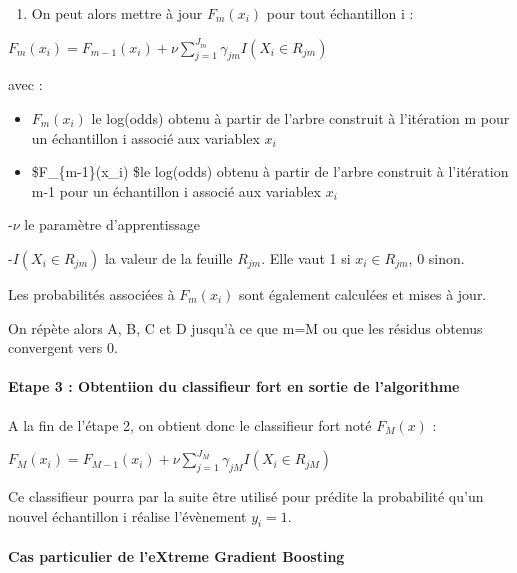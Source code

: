 \documentclass[
]{article}
\providecommand{\tightlist}{%
  \setlength{\itemsep}{0pt}\setlength{\parskip}{0pt}}
\begin{document}
\begin{enumerate}
\def\labelenumi{\Alph{enumi})}
\setcounter{enumi}{3}
\tightlist
\item
  On peut alors mettre à jour \(F_m(x_i)\) pour tout échantillon i :
\end{enumerate}

\begin{center}
   $F_m(x_i)=F_{m-1}(x_i)+ \nu \sum_{j=1}^{J_m}\gamma_{jm}I(X_i \in R_{jm})$
\end{center}

avec :

\begin{itemize}
\item
  \(F_m(x_i)\) le log(odds) obtenu à partir de l'arbre construit à
  l'itération m pour un échantillon i associé aux variablex \(x_i\)
\item
  \$F\_\{m-1\}(x\_i) \$le log(odds) obtenu à partir de l'arbre construit
  à l'itération m-1 pour un échantillon i associé aux variablex \(x_i\)
\end{itemize}

-\(\nu\) le paramètre d'apprentissage

-\(I(X_i \in R_{jm})\) la valeur de la feuille \(R_{jm}\). Elle vaut 1
si \(x_i \in R_{jm}\), 0 sinon.

Les probabilités associées à \(F_m(x_i)\) sont également calculées et
mises à jour.

On répète alors A, B, C et D jusqu'à ce que m=M ou que les résidus
obtenus convergent vers 0.

\hypertarget{etape-3-obtentiion-du-classifieur-fort-en-sortie-de-lalgorithme}{%
\paragraph{Etape 3 : Obtentiion du classifieur fort en sortie de
l'algorithme}\label{etape-3-obtentiion-du-classifieur-fort-en-sortie-de-lalgorithme}}

A la fin de l'étape 2, on obtient donc le classifieur fort noté
\(F_M(x)\) :

\begin{center}
   $F_M(x_i)=F_{M-1}(x_i)+ \nu \sum_{j=1}^{J_M}\gamma_{jM}I(X_i \in R_{jM})$
\end{center}

Ce classifieur pourra par la suite être utilisé pour prédite la
probabilité qu'un nouvel échantillon i réalise l'évènement \(y_i=1\).

\hypertarget{cas-particulier-de-lextreme-gradient-boosting}{%
\paragraph{Cas particulier de l'eXtreme Gradient
Boosting}\label{cas-particulier-de-lextreme-gradient-boosting}}
\end{document}
